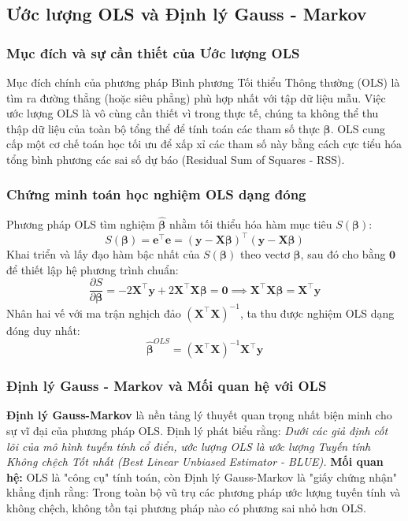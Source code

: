 \documentclass[12pt, a4paper]{article}
\begin{document}
	\subsection{Ước lượng OLS và Định lý Gauss - Markov}
	\subsubsection{Mục đích và sự cần thiết của Ước lượng OLS}
	Mục đích chính của phương pháp Bình phương Tối thiểu Thông thường (OLS) là tìm ra đường thẳng (hoặc siêu phẳng) phù hợp nhất với tập dữ liệu mẫu. Việc ước lượng OLS là vô cùng cần thiết vì trong thực tế, chúng ta không thể thu thập dữ liệu của toàn bộ tổng thể để tính toán các tham số thực $\boldsymbol{\beta}$. OLS cung cấp một cơ chế toán học tối ưu để xấp xỉ các tham số này bằng cách cực tiểu hóa tổng bình phương các sai số dự báo (Residual Sum of Squares - RSS).
	
	\subsubsection{Chứng minh toán học nghiệm OLS dạng đóng}
	Phương pháp OLS tìm nghiệm $\hat{\boldsymbol{\beta}}$ nhằm tối thiểu hóa hàm mục tiêu $S(\boldsymbol{\beta})$:
	\begin{equation}
		S(\boldsymbol{\beta}) = \mathbf{e}^{\top}\mathbf{e} = (\mathbf{y} - \mathbf{X}\boldsymbol{\beta})^{\top}(\mathbf{y} - \mathbf{X}\boldsymbol{\beta})
	\end{equation}
	Khai triển và lấy đạo hàm bậc nhất của $S(\boldsymbol{\beta})$ theo vectơ $\boldsymbol{\beta}$, sau đó cho bằng $\mathbf{0}$ để thiết lập hệ phương trình chuẩn:
	\begin{equation}
		\frac{\partial S}{\partial \boldsymbol{\beta}} = -2\mathbf{X}^{\top}\mathbf{y} + 2\mathbf{X}^{\top}\mathbf{X}\boldsymbol{\beta} = \mathbf{0} \implies \mathbf{X}^{\top}\mathbf{X}\boldsymbol{\beta} = \mathbf{X}^{\top}\mathbf{y}
	\end{equation}
	Nhân hai vế với ma trận nghịch đảo $(\mathbf{X}^{\top}\mathbf{X})^{-1}$, ta thu được nghiệm OLS dạng đóng duy nhất:
	\begin{equation}\label{eq:ols_solution}
		\hat{\boldsymbol{\beta}}^{OLS} = (\mathbf{X}^{\top}\mathbf{X})^{-1} \mathbf{X}^{\top}\mathbf{y}
	\end{equation}
	
	\subsubsection{Định lý Gauss - Markov và Mối quan hệ với OLS}
	\textbf{Định lý Gauss-Markov} \cite{maddala2001} là nền tảng lý thuyết quan trọng nhất biện minh cho sự vĩ đại của phương pháp OLS. Định lý phát biểu rằng: \textit{Dưới các giả định cốt lõi của mô hình tuyến tính cổ điển, ước lượng OLS là ước lượng Tuyến tính Không chệch Tốt nhất (Best Linear Unbiased Estimator - BLUE).}
	\textbf{Mối quan hệ:} OLS là "công cụ" tính toán, còn Định lý Gauss-Markov là "giấy chứng nhận" khẳng định rằng: Trong toàn bộ vũ trụ các phương pháp ước lượng tuyến tính và không chệch, không tồn tại phương pháp nào có phương sai nhỏ hơn OLS.
	
\end{document}

